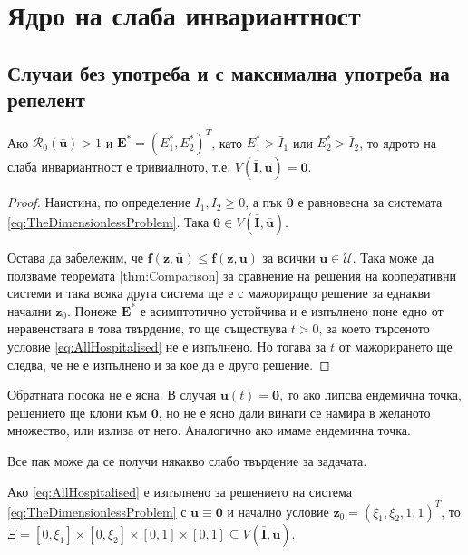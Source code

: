 \section{\hspace{1em} Ядро на слаба инвариантност}

\subsection{Случаи без употреба и с максимална употреба на репелент}

\begin{proposition}
  Ако $\mathscr{R}_0(\bar{\mathbf{u}}) > 1$ и $\mathbf{E}^* = (E_1^*, E_2^*)^T$, като $E_1^* > \bar{I}_1$ или $E_2^* > \bar{I}_2$, то ядрото на слаба инвариантност е тривиалното, т.е. $V(\bar{\mathbf{I}}, \bar{\mathbf{u}}) = {\mathbf{0}}$.
\end{proposition}

\begin{proof}
  Наистина, по определение $I_1, I_2 \geq 0$, а пък $\mathbf{0}$ е равновесна за системата \eqref{eq:TheDimensionlessProblem}. Така $\mathbf{0} \in V(\bar{\mathbf{I}}, \bar{\mathbf{u}})$.

  Остава да забележим, че $\mathbf{f}(\mathbf{z}, \bar{\mathbf{u}}) \leq \mathbf{f}(\mathbf{z}, \mathbf{u})$ за всички $\mathbf{u} \in \mathscr{U}$.
  Така може да ползваме теоремата \eqref{thm:Comparison} за сравнение на решения на кооперативни системи и така всяка друга система ще е с мажориращо решение за еднакви начални $\mathbf{z}_0$.
  Понеже $\mathbf{E}^*$ е асимптотично устойчива и е изпълнено поне едно от неравенствата в това твърдение, то ще съществува $t > 0$, за което търсеното условие \eqref{eq:AllHospitalised} не е изпълнено.
  Но тогава за $t$ от мажорирането ще следва, че не е изпълнено и за кое да е друго решение.
\end{proof}

Обратната посока не е ясна. В случая $\mathbf{u}(t)=\mathbf{0}$, то ако липсва ендемична точка, решението ще клони към $\mathbf{0}$, но не е ясно дали винаги се намира в желаното множество, или излиза от него. Аналогично ако имаме ендемична точка.

Все пак може да се получи някакво слабо твърдение за задачата.

\begin{proposition}
  Ако \eqref{eq:AllHospitalised} е изпълнено за решението на система \eqref{eq:TheDimensionlessProblem} с $\mathbf{u} \equiv \mathbf{0}$ и начално условие $\mathbf{z}_0 = (\xi_1, \xi_2, 1, 1)^T$, то $\Xi = [0, \xi_1] \times [0, \xi_2] \times [0, 1] \times [0, 1] \subseteq V(\bar{\mathbf{I}}, \bar{\mathbf{u}})$.
\end{proposition}

